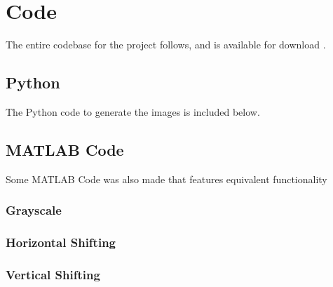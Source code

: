 \documentclass[10pt]{report}
\begin{document}
\newpage

\appendix

\section{Code}

The entire codebase for the project follows, and is available for download .

    \subsection{Python}

    The Python code to generate the images is included below.

        

    \newpage

    \subsection{MATLAB Code}

    Some MATLAB Code was also made that features equivalent functionality

        \subsubsection{Grayscale}

        

        \subsubsection{Horizontal Shifting}

        

        \subsubsection{Vertical Shifting}

        
\end{document}
